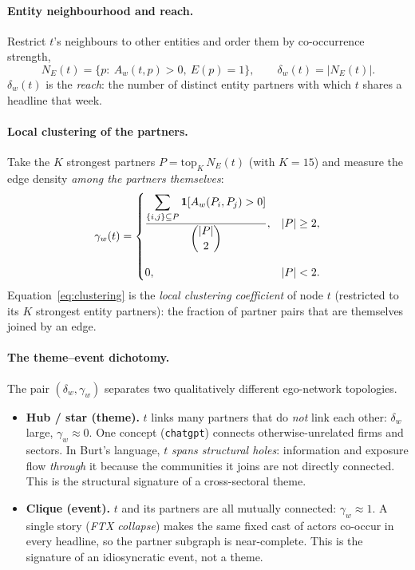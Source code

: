 \documentclass[11pt]{article}
\newcommand{\ind}[1]{\mathbf{1}\!\left[#1\right]}        %
\renewcommand{\deg}{\delta}                               %
\newcommand{\clu}{\gamma}                                 %
\theoremstyle{definition}
\theoremstyle{remark}
\begin{document}
\paragraph{Entity neighbourhood and reach.}
Restrict $t$'s neighbours to other entities and order them by co-occurrence strength,
\begin{equation}
N_E(t)=\bigl\{p:\ A_w(t,p)>0,\ E(p)=1\bigr\},\qquad
\deg_w(t)=\bigl|N_E(t)\bigr|.
\end{equation}
$\deg_w(t)$ is the \emph{reach}: the number of distinct entity partners with which $t$ shares
a headline that week.

\paragraph{Local clustering of the partners.}
Take the $K$ strongest partners $P=\mathrm{top}_K\,N_E(t)$ (with $K=15$) and measure the edge
density \emph{among the partners themselves}:
\begin{equation}
\clu_w(t)=
\begin{dcases}
\frac{\displaystyle\sum_{\{i,j\}\subseteq P} \ind{A_w(P_i,P_j)>0}}{\dbinom{|P|}{2}}, & |P|\ge 2,\\[2ex]
0, & |P|<2.
\end{dcases}
\label{eq:clustering}
\end{equation}
Equation~\eqref{eq:clustering} is the \emph{local clustering coefficient} of node $t$
(restricted to its $K$ strongest entity partners): the fraction of partner pairs that are
themselves joined by an edge.

\paragraph{The theme--event dichotomy.}
The pair $(\deg_w,\clu_w)$ separates two qualitatively different ego-network topologies.
\begin{itemize}[leftmargin=1.6em]
  \item \textbf{Hub / star (theme).} $t$ links many partners that do \emph{not} link each
        other: $\deg_w$ large, $\clu_w\approx 0$. One concept (\texttt{chatgpt}) connects
        otherwise-unrelated firms and sectors. In Burt's language, $t$ \emph{spans structural
        holes}: information and exposure flow \emph{through} it because the communities it
        joins are not directly connected. This is the structural signature of a
        cross-sectoral theme.
  \item \textbf{Clique (event).} $t$ and its partners are all mutually connected: $\clu_w\approx 1$.
        A single story (\emph{FTX collapse}) makes the same fixed cast of actors co-occur in
        every headline, so the partner subgraph is near-complete. This is the signature of an
        idiosyncratic event, not a theme.
\end{itemize}
\end{document}
